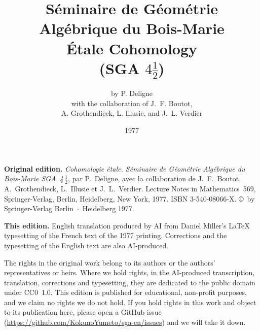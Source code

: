 \documentclass[oneside]{book}
\title{Séminaire de Géométrie Algébrique du Bois-Marie\\[20pt]
Étale Cohomology\\[20pt]
(SGA $4\frac 1 2$)}
\author{by P. Deligne\\[10pt]
with the collaboration of J.~F. Boutot,\\
A. Grothendieck, L. Illusie, and J.~L. Verdier}
\date{1977}
\begin{document}
\maketitle
\clearpage
\thispagestyle{empty}
\null\vfill
\begingroup\small
\noindent\textbf{Original edition.} \textit{Cohomologie \'etale. S\'eminaire de G\'eom\'etrie Alg\'ebrique du Bois-Marie SGA~4\,$\frac12$}, par P.~Deligne, avec la collaboration de J.~F.~Boutot, A.~Grothendieck, L.~Illusie et J.~L.~Verdier. Lecture Notes in Mathematics~569, Springer-Verlag, Berlin, Heidelberg, New York, 1977. ISBN 3-540-08066-X. \copyright{}~by Springer-Verlag Berlin~$\cdot$~Heidelberg 1977.\par
\medskip
\noindent\textbf{This edition.} English translation produced by AI from Daniel Miller's \LaTeX{} typesetting of the French text of the 1977 printing. Corrections and the typesetting of the English text are also AI-produced.\par
\medskip
\noindent The rights in the original work belong to its authors or the authors' representatives or heirs. Where we hold rights, in the AI-produced transcription, translation, corrections and typesetting, they are dedicated to the public domain under CC0~1.0. This edition is published for educational, non-profit purposes, and we claim no rights we do not hold. If you hold rights in this work and object to its publication here, please open a GitHub issue (\url{https://github.com/KokunoYumeto/sga-en/issues}) and we will take it down.\par
\endgroup
\clearpage



\tableofcontents













\end{document}
